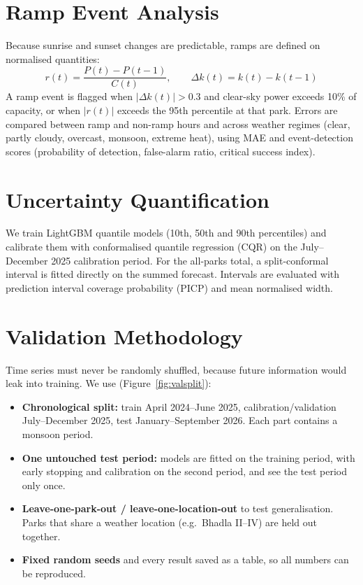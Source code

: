 \documentclass[12pt]{report}
\begin{document}
\section{Ramp Event Analysis}
\vspace{1mm}
Because sunrise and sunset changes are predictable, ramps are defined on normalised quantities:
\begin{equation}
    r(t) = \frac{P(t) - P(t-1)}{C(t)}, \qquad \Delta k(t) = k(t) - k(t-1)
\end{equation}
A ramp event is flagged when $|\Delta k(t)| > 0.3$ and clear-sky power exceeds 10\% of capacity, or when $|r(t)|$ exceeds the 95th percentile at that park. Errors are compared between ramp and non-ramp hours and across weather regimes (clear, partly cloudy, overcast, monsoon, extreme heat), using MAE and event-detection scores (probability of detection, false-alarm ratio, critical success index).

\section{Uncertainty Quantification}
\vspace{1mm}
We train LightGBM quantile models (10th, 50th and 90th percentiles) and calibrate them with conformalised quantile regression (CQR) \cite{romano2019} on the July--December 2025 calibration period. For the all-parks total, a split-conformal interval is fitted directly on the summed forecast. Intervals are evaluated with prediction interval coverage probability (PICP) and mean normalised width.

\section{Validation Methodology}
\vspace{1mm}
Time series must never be randomly shuffled, because future information would leak into training. We use (Figure~\ref{fig:valsplit}):
\begin{itemize}[noitemsep]
    \item \textbf{Chronological split:} train April 2024--June 2025, calibration/validation July--December 2025, test January--September 2026. Each part contains a monsoon period.
    \item \textbf{One untouched test period:} models are fitted on the training period, with early stopping and calibration on the second period, and see the test period only once.
    \item \textbf{Leave-one-park-out / leave-one-location-out} to test generalisation. Parks that share a weather location (e.g.\ Bhadla II--IV) are held out together.
    \item \textbf{Fixed random seeds} and every result saved as a table, so all numbers can be reproduced.
\end{itemize}
\end{document}
